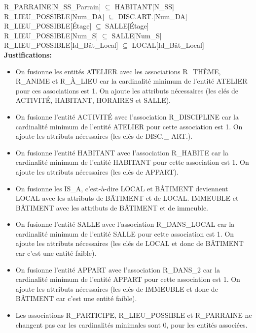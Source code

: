 \documentclass[a4paper,10.5pt]{report}
\begin{document}
	R\_PARRAINE[N\_SS\_Parrain] $\subseteq$ HABITANT[N\_SS] \\

	R\_LIEU\_POSSIBLE[Num\_DA] $\subseteq$ DISC.ART.[Num\_DA] \\

	R\_LIEU\_POSSIBLE[Étage] $\subseteq$ SALLE[Étage] \\

	R\_LIEU\_POSSIBLE[Num\_S] $\subseteq$ SALLE[Num\_S] \\

	R\_LIEU\_POSSIBLE[Id\_Bât\_Local] $\subseteq$ LOCAL[Id\_Bât\_Local] \\

	\textbf{Justifications: }
	\begin{itemize}
		\item On fusionne les entités ATELIER avec les associations R\_THÈME, R\_ANIME et R\_À\_LIEU car la cardinalité minimum de l'entité ATELIER pour ces associations est 1. On ajoute les attributs nécessaires (les clés de ACTIVITÉ, HABITANT, HORAIRES et SALLE).
		\item On fusionne l'entité ACTIVITÉ avec l'association R\_DISCIPLINE car la cardinalité minimum de l'entité ATELIER pour cette association est 1. On ajoute les attributs nécessaires (les clés de DISC.\_ ART.).
		\item On fusionne l'entité HABITANT avec l'association R\_HABITE car la cardinalité minimum de l'entité HABITANT pour cette association est 1. On ajoute les attributs nécessaires (les clés de APPART).
		\item On fusionne les IS\_A, c'est-à-dire LOCAL et BÂTIMENT deviennent LOCAL avec les attributs de BÂTIMENT et de LOCAL\@. IMMEUBLE et BÂTIMENT avec les attributs de BÂTIMENT et de immeuble.	

		\item On fusionne l'entité SALLE avec l'association R\_DANS\_LOCAL car la cardinalité minimum de l'entité SALLE pour cette association est 1. On ajoute les attributs nécessaires (les clés de LOCAL et donc de BÂTIMENT car c'est une entité faible). 
		\item On fusionne l'entité APPART avec l'association R\_DANS\_2 car la cardinalité minimum de l'entité APPART pour cette association est 1. On ajoute les attributs nécessaires (les clés de IMMEUBLE et donc de BÂTIMENT car c'est une entité faible).
		\item Les associations R\_PARTICIPE, R\_LIEU\_POSSIBLE et R\_PARRAINE ne changent pas car les cardinalités minimales sont 0, pour les entités associées.

	\end{itemize}
	
\end{document}
